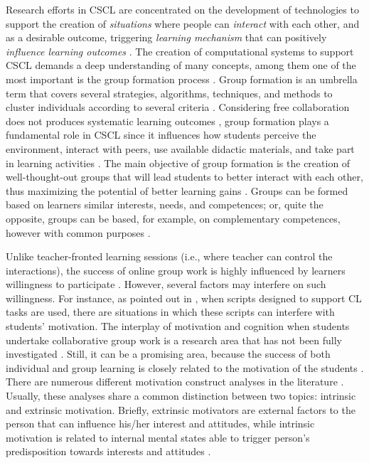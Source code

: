 Research efforts in CSCL are concentrated on the development of technologies to support the creation of \textit{situations} where people can \textit{interact} with each other, and as a desirable outcome, triggering \textit{learning mechanism} that can positively \textit{influence learning outcomes} \cite{What_do_you_mean_by}. The creation of computational systems to support CSCL demands a deep understanding of many concepts, among them one of the most important is the group formation process \cite{An_ontology_engineering_approach}. 
Group formation is an umbrella term that covers several strategies, algorithms, techniques, and methods to cluster individuals according to several criteria \cite{Group_Formation_Algorithms}. Considering free collaboration does not produces systematic learning outcomes \cite{An_ontology_engineering_approach}, group formation plays a fundamental role in CSCL since it influences how students perceive the environment, interact with peers, use available didactic materials, and take part in learning activities \cite{Over-scripting_CSCL}. The main objective of  group formation is the creation of well-thought-out groups that will lead students to better interact with each other, thus maximizing the potential of better learning gains \cite{Designing_for_interaction,Collaborative_Learning_Techniques}. 
Groups can be formed based on learners similar interests, needs, and competences; or, quite the opposite, groups can be based, for example, on complementary competences, however with common purposes \cite{Specifying_computer_supported_collaboration_scripts}. 

Unlike teacher-fronted learning sessions (i.e., where teacher can control the interactions), the success of online group work is highly influenced by learners willingness to participate \cite{Causal_Relationships_Between}. However, several factors may interfere on such willingness. For instance, as pointed out in \cite{Gamification_of_Collaborative_Learning}, when scripts designed to support CL tasks are used, there are situations in which  these scripts can interfere with students’ motivation. 
The interplay of motivation and cognition when students undertake collaborative group work is a research area that has not been fully investigated \cite{The_interrelationship_of_emotion_and_cognition}. Still, it can be a promising area, because the success of both individual and group learning is closely related to the motivation of the students \cite{Computer_supported_team_based_learning}. There are numerous different motivation construct analyses in the literature \cite{Self-determination_theory_and_the_facilitation}. Usually, these analyses share a common distinction between two topics: intrinsic and extrinsic motivation. Briefly, extrinsic motivators are external factors to the person that can influence his/her interest and attitudes, while intrinsic motivation is related to internal mental states able to trigger person’s predisposition towards interests and attitudes \cite{Beyond_Talk_Creating_Autonomous_Motivation}.

